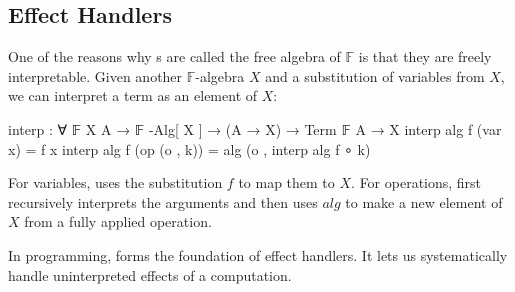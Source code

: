 \subsection{Effect Handlers}

One of the reasons why s are called the free algebra of $\mathbb{F}$ is that they are freely interpretable.
%
Given another $\mathbb{F}$-algebra $X$ and a substitution of variables from $X$, we can interpret a term as an element of $X$:
%
\begin{center}\begin{code}
interp : ∀ {𝔽} {X A} → 𝔽 -Alg[ X ] → (A → X) → Term 𝔽 A → X
interp alg f (var x)       = f x
interp alg f (op (o , k))  = alg (o , interp alg f ∘ k)
\end{code}\end{center}
%
For variables,  uses the substitution $f$ to map them to $X$.
%
For operations,  first recursively interprets the arguments and then uses ${alg}$ to make a new element of $X$ from a fully applied operation.

In programming,  forms the foundation of effect handlers.
%
It lets us systematically handle uninterpreted effects of a computation.
